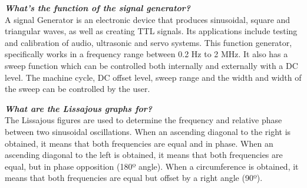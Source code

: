 \documentclass[letterpaper]{article}
\begin{document}
\textit{\textbf{What's the function of the signal generator?}}\\
A signal Generator is an electronic device that produces sinusoidal, square and triangular waves, as well as creating TTL signals. Its applications include testing and calibration of audio, ultrasonic and servo systems.
This function generator, specifically works in a frequency range between 0.2 Hz to 2 MHz. It also has a sweep function which can be controlled both internally and externally with a DC level. The machine cycle, DC offset level, sweep range and the width and width of the sweep can be controlled by the user.

\textit{\textbf{What are the Lissajous graphs for?}}\\
The Lissajous figures are used to determine the frequency and relative phase between two sinusoidal oscillations.
When an ascending diagonal to the right is obtained, it means that both frequencies are equal and in phase.
When an ascending diagonal to the left is obtained, it means that both frequencies are equal, but in phase opposition (180º angle).
When a circumference is obtained, it means that both frequencies are equal but offset by a right angle (90º).
\end{document}
